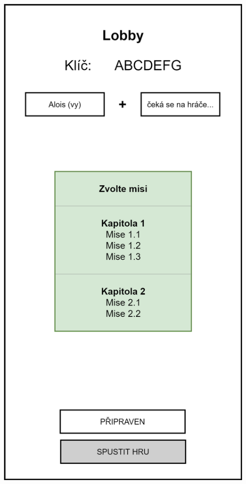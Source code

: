 \documentclass[czech,aspectratio=169]{beamer}
\begin{document}
\begin{frame}
\begin{columns}
\begin{column}{.25\textwidth}
\begin{center}
          \includegraphics[width=.9\textwidth]{slides/screen-2}
        \end{center}
      \end{column}
      \begin{column}{.25\textwidth}
        \begin{center}

\end{center}
\end{column}
\end{columns}
\end{frame}
\end{document}
